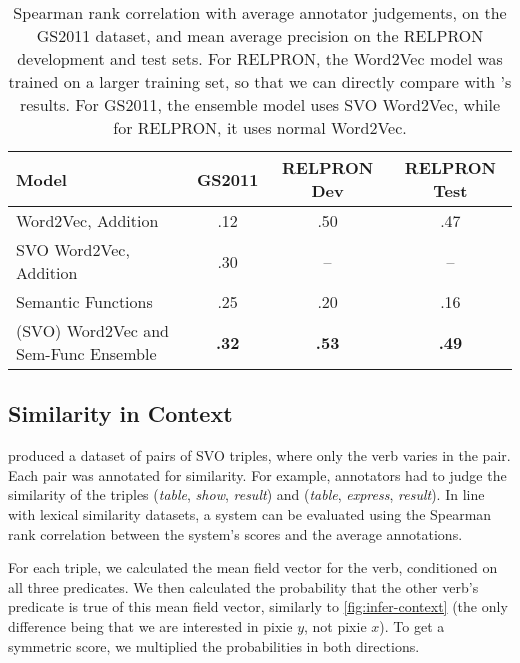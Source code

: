 \documentclass[a4paper,11pt]{article}
\begin{document}
\begin{table*}[t]
\center
\begin{tabularx}{.95\textwidth}{|l|C|C|C|}

\hline
Model & GS2011 & \small RELPRON Dev & \small RELPRON Test \\ \hline
Word2Vec, Addition & .12 & .50 & .47 \\
SVO Word2Vec, Addition & .30 & -- & -- \\
Semantic Functions & .25 & .20 & .16 \\
(SVO) Word2Vec and Sem-Func Ensemble & \bf .32 & \bf .53 & \bf .49 \\ \hline

\end{tabularx}
\caption{
Spearman rank correlation with average annotator judgements,
on the GS2011 dataset, and
mean average precision on the RELPRON development and test sets.
For RELPRON, the Word2Vec model was trained on a larger training set,
so that we can directly compare with \citeauthor{rimell2016relpron}'s results.
For GS2011, the ensemble model uses SVO Word2Vec,
while for RELPRON, it uses normal Word2Vec.
}
\label{tab:beyond}
\end{table*}


\subsection{Similarity in Context}
\label{sec:cont-sim}

\citet{grefenstette2011svo} produced a dataset of pairs of SVO triples,
where only the verb varies in the pair.
Each pair was annotated for similarity.
For example, annotators had to judge the similarity of the triples
(\textit{table}, \textit{show}, \textit{result}) and
(\textit{table}, \textit{express}, \textit{result}).
In line with lexical similarity datasets,
a system can be evaluated using the Spearman rank correlation
between the system's scores and the average annotations.

For each triple, we calculated the mean field vector for the verb, conditioned on all three predicates.
We then calculated the probability that the other verb's predicate is true of this mean field vector,
similarly to \cref{fig:infer-context}
(the only difference being that we are interested in pixie $y$, not pixie $x$).
To get a symmetric score, we multiplied the probabilities in both directions.
\end{document}
